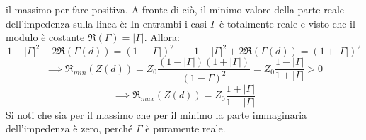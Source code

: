 \documentclass{book}
\begin{document}
    il massimo per fare positiva. A fronte di ciò, il minimo valore della parte reale dell'impedenza sulla linea è:
    In entrambi i casi $\Gamma$ è totalmente reale e visto che il modulo è costante $\Re(\Gamma) = |\Gamma|$. Allora:
    \begin{equation}
        1+|\Gamma|^{2}-2\Re(\Gamma (d)) = (1-|\Gamma|)^{2} \qquad 1+|\Gamma|^{2}+2\Re(\Gamma (d)) =(1+|\Gamma|)^{2}
    \end{equation}
    \begin{equation}
         \implies \Re_{min}(Z(d)) = Z_{0} \frac{(1-|\Gamma|)(1+|\Gamma|)}{(1-\Gamma)^{2}}=Z_{0}\frac{1-|\Gamma|}{1+|\Gamma|} > 0
    \end{equation}
    \begin{equation}
        \implies \Re_{max}(Z(d))=Z_{0}\frac{1+|\Gamma|}{1-|\Gamma|}
    \end{equation}
    Si noti che sia per il massimo che per il minimo la parte immaginaria dell'impedenza è zero, perché $\Gamma$ è puramente reale.
\end{document}
